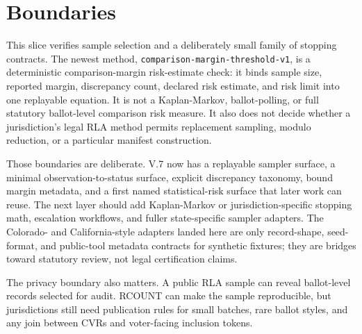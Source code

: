 \section{Boundaries}

This slice verifies sample selection and a deliberately small family of
stopping contracts. The newest method,
\texttt{comparison-margin-threshold-v1}, is a deterministic comparison-margin
risk-estimate check: it binds sample size, reported margin, discrepancy count,
declared risk estimate, and risk limit into one replayable equation. It is not
a Kaplan-Markov, ballot-polling, or full statutory ballot-level comparison
risk measure. It also does not decide whether a jurisdiction's legal RLA method
permits replacement sampling, modulo reduction, or a particular manifest
construction.

Those boundaries are deliberate. V.7 now has a replayable sampler surface, a
minimal observation-to-status surface, explicit discrepancy taxonomy, bound
margin metadata, and a first named statistical-risk surface that later work can
reuse. The next layer should add Kaplan-Markov or jurisdiction-specific
stopping math, escalation workflows, and fuller state-specific sampler
adapters. The Colorado- and California-style adapters landed here are only
record-shape, seed-format, and public-tool metadata contracts for synthetic
fixtures; they are bridges toward statutory review, not legal certification
claims.

The privacy boundary also matters. A public RLA sample can reveal ballot-level
records selected for audit. RCOUNT can make the sample reproducible, but
jurisdictions still need publication rules for small batches, rare ballot
styles, and any join between CVRs and voter-facing inclusion tokens.
